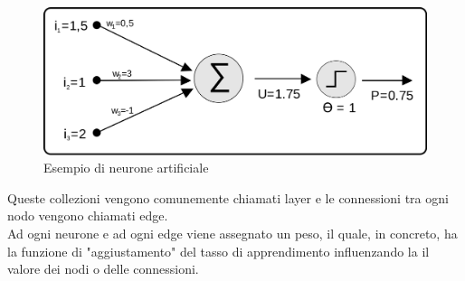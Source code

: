 \begin{figure}[H]
\centering
\includegraphics[scale=0.1]{img/neuroneArtificiale.png}
\caption{Esempio di neurone artificiale}
\end{figure}

Queste collezioni vengono comunemente chiamati layer e le connessioni tra ogni nodo vengono chiamati edge.\\
Ad ogni neurone e ad ogni edge viene assegnato un peso, il quale, in concreto, ha la funzione di "aggiustamento" del tasso di apprendimento influenzando la il valore dei nodi o delle connessioni.

